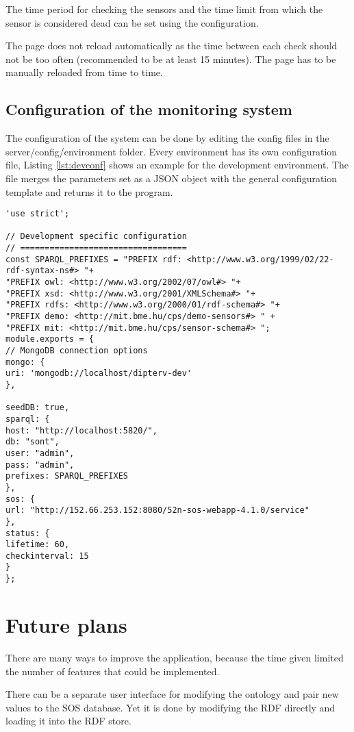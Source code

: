 The time period for checking the sensors and the time limit from which the sensor is considered dead can be set using the configuration. 

The page does not reload automatically as the time between each check should not be too often (recommended to be at least 15 minutes). The page has to be manually reloaded from time to time.


\subsection{Configuration of the monitoring system}
The configuration of the system can be done by editing the config files in the  server/config/environment folder. Every environment has its own configuration file, Listing \ref{lst:devconf} shows an example for the development environment. The file merges the parameters set as a JSON object with the general configuration template and returns it to the program.


\begin{lstlisting}[caption={Sample configuration for development environment\label{lst:devconf}}]
'use strict';

// Development specific configuration
// ==================================
const SPARQL_PREFIXES = "PREFIX rdf: <http://www.w3.org/1999/02/22-rdf-syntax-ns#> "+
"PREFIX owl: <http://www.w3.org/2002/07/owl#> "+
"PREFIX xsd: <http://www.w3.org/2001/XMLSchema#> "+
"PREFIX rdfs: <http://www.w3.org/2000/01/rdf-schema#> "+
"PREFIX demo: <http://mit.bme.hu/cps/demo-sensors#> " +
"PREFIX mit: <http://mit.bme.hu/cps/sensor-schema#> ";
module.exports = {
// MongoDB connection options
mongo: {
uri: 'mongodb://localhost/dipterv-dev'
},

seedDB: true,
sparql: {
host: "http://localhost:5820/",
db: "sont",
user: "admin",
pass: "admin",
prefixes: SPARQL_PREFIXES
},
sos: {
url: "http://152.66.253.152:8080/52n-sos-webapp-4.1.0/service"
},
status: {
lifetime: 60,
checkinterval: 15
}
};
\end{lstlisting}

\section{Future plans}

There are many ways to improve the application, because the time given limited the number of features that could be implemented. 

There can be a separate user interface for modifying the ontology and pair new values to the SOS database. Yet it is done by modifying the RDF directly and loading it into the RDF store. 


